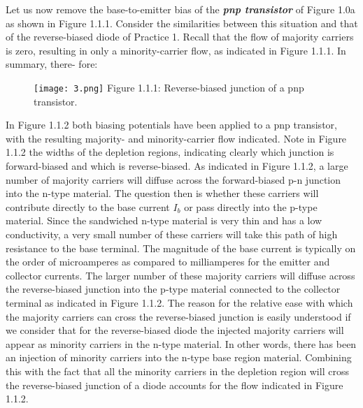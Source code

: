 \begin{multicols}{2}
Let us now remove the base-to-emitter bias of the {\bfseries\itshape pnp transistor} of Figure 1.0a as shown in Figure 1.1.1. Consider the similarities between this situation and that of the reverse-biased diode of Practice 1. Recall that the flow of majority carriers is zero, resulting in only a minority-carrier flow, as indicated in Figure 1.1.1. In summary, there- fore: \hfill \break

{\large\bfseries\itshape\color{carmine}{One p-n junction of a transistor is reverse biased, while the other is forward biased.}}

\begin{figure}[H]
\texttt{[image: 3.png]}
\centering \linebreak \linebreak Figure 1.1.1: Reverse-biased junction of a pnp transistor.
\end{figure}
\end{multicols}

In Figure 1.1.2 both biasing potentials have been applied to a pnp transistor, with the resulting majority- and minority-carrier flow indicated. Note in Figure 1.1.2 the widths of the depletion regions, indicating clearly which junction is forward-biased and which is reverse-biased. As indicated in Figure 1.1.2, a large number of majority carriers will diffuse across the forward-biased p-n junction into the n-type material. The question then is whether these carriers will contribute directly to the base current $I_{b}$ or pass directly into the p-type material. Since the sandwiched n-type material is very thin and has a low conductivity, a very small number of these carriers will take this path of high resistance to the base terminal. The magnitude of the base current is typically on the order of microamperes as compared to milliamperes for the emitter and collector currents. The larger number of these majority carriers will diffuse across the reverse-biased junction into the p-type material connected to the collector terminal as indicated in Figure 1.1.2. The reason for the relative ease with which the majority carriers can cross the reverse-biased junction is easily understood if we consider that for the reverse-biased diode the injected majority carriers will appear as minority carriers in the n-type material. In other words, there has been an injection of minority carriers into the n-type base region material. Combining this with the fact that all the minority carriers in the depletion region will cross the reverse-biased junction of a diode accounts for the flow indicated in Figure 1.1.2.

